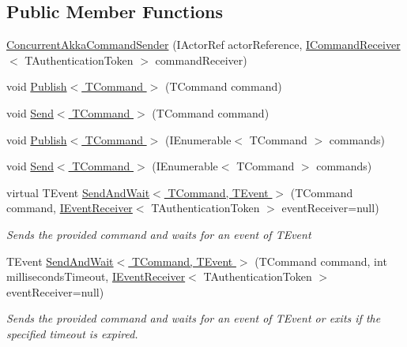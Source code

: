 \subsection*{Public Member Functions}
\begin{DoxyCompactItemize}
\item 
\hyperlink{classCqrs_1_1Akka_1_1Commands_1_1ConcurrentAkkaCommandSender_a203cd12567f100fb3545b029f6ed0181}{Concurrent\+Akka\+Command\+Sender} (I\+Actor\+Ref actor\+Reference, \hyperlink{interfaceCqrs_1_1Commands_1_1ICommandReceiver}{I\+Command\+Receiver}$<$ T\+Authentication\+Token $>$ command\+Receiver)
\item 
void \hyperlink{classCqrs_1_1Akka_1_1Commands_1_1ConcurrentAkkaCommandSender_a5f65348c92377342ad8400eb6b40a2ac}{Publish$<$ T\+Command $>$} (T\+Command command)
\item 
void \hyperlink{classCqrs_1_1Akka_1_1Commands_1_1ConcurrentAkkaCommandSender_a46b88bf730db4a530586737d699e1f12}{Send$<$ T\+Command $>$} (T\+Command command)
\item 
void \hyperlink{classCqrs_1_1Akka_1_1Commands_1_1ConcurrentAkkaCommandSender_a6505fbb31a885de31e68b2b87e969c31}{Publish$<$ T\+Command $>$} (I\+Enumerable$<$ T\+Command $>$ commands)
\item 
void \hyperlink{classCqrs_1_1Akka_1_1Commands_1_1ConcurrentAkkaCommandSender_a263a720c8c865bc246756307c0004aa6}{Send$<$ T\+Command $>$} (I\+Enumerable$<$ T\+Command $>$ commands)
\item 
virtual T\+Event \hyperlink{classCqrs_1_1Akka_1_1Commands_1_1ConcurrentAkkaCommandSender_a655aa63a47944035c113f9668bcf1284}{Send\+And\+Wait$<$ T\+Command, T\+Event $>$} (T\+Command command, \hyperlink{interfaceCqrs_1_1Events_1_1IEventReceiver}{I\+Event\+Receiver}$<$ T\+Authentication\+Token $>$ event\+Receiver=null)
\begin{DoxyCompactList}\small\item\em Sends the provided {\itshape command}  and waits for an event of {\itshape T\+Event}  \end{DoxyCompactList}\item 
T\+Event \hyperlink{classCqrs_1_1Akka_1_1Commands_1_1ConcurrentAkkaCommandSender_a171974eb1ba3eb7be9816bd7927227ac}{Send\+And\+Wait$<$ T\+Command, T\+Event $>$} (T\+Command command, int milliseconds\+Timeout, \hyperlink{interfaceCqrs_1_1Events_1_1IEventReceiver}{I\+Event\+Receiver}$<$ T\+Authentication\+Token $>$ event\+Receiver=null)
\begin{DoxyCompactList}\small\item\em Sends the provided {\itshape command}  and waits for an event of {\itshape T\+Event}  or exits if the specified timeout is expired. \end{DoxyCompactList}\item 

\end{DoxyCompactItemize}
